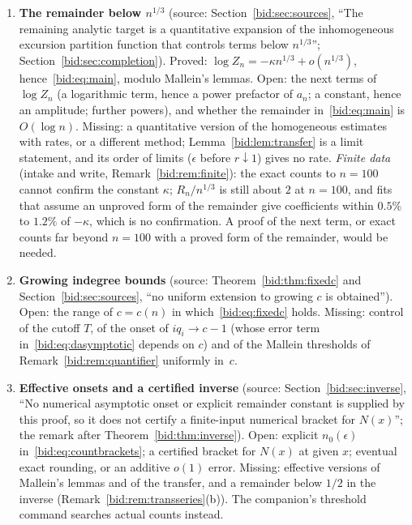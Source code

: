 \documentclass[11pt,letterpaper]{article}
\numberwithin{equation}{section}
\theoremstyle{remark}\newtheorem{remark}[theorem]{Remark}
\begin{document}
\begin{enumerate}
\item\label{bid:q:remainder} \textbf{The remainder below $n^{1/3}$} (source:
 Section~\ref{bid:sec:sources}, ``The remaining analytic target is a
 quantitative expansion of the inhomogeneous excursion partition function that
 controls terms below $n^{1/3}$''; Section~\ref{bid:sec:completion}). Proved:
 $\log Z_n=-\kappa n^{1/3}+o(n^{1/3})$, hence~\eqref{bid:eq:main}, modulo
 Mallein's lemmas. Open: the next terms of $\log Z_n$ (a logarithmic term,
 hence a power prefactor of $a_n$; a constant, hence an amplitude; further
 powers), and whether the remainder in~\eqref{bid:eq:main} is
 $O(\log n)$. Missing: a quantitative version of the homogeneous estimates
 with rates, or a different method; Lemma~\ref{bid:lem:transfer} is a
 limit statement, and its order of limits ($\epsilon$ before $r\downarrow1$)
 gives no rate. \emph{Finite data} (intake and write,
 Remark~\ref{bid:rem:finite}): the exact counts to $n=100$ cannot confirm the
 constant $\kappa$; $R_n/n^{1/3}$ is still about $2$ at $n=100$, and fits that
 assume an unproved form of the remainder give coefficients within $0.5\%$
 to $1.2\%$ of $-\kappa$, which is no confirmation. A proof of the next term,
 or exact counts far beyond $n=100$ with a proved form of the remainder,
 would be needed.
\item\label{bid:q:uniform} \textbf{Growing indegree bounds} (source:
 Theorem~\ref{bid:thm:fixedc} and Section~\ref{bid:sec:sources}, ``no uniform
 extension to growing $c$ is obtained''). Open: the range of $c=c(n)$ in
 which~\eqref{bid:eq:fixedc} holds. Missing: control of the cutoff $T$, of
 the onset of $iq_i\to c-1$ (whose error term in~\eqref{bid:eq:dasymptotic}
 depends on $c$) and of the Mallein thresholds of
 Remark~\ref{bid:rem:quantifier} uniformly in~$c$.
\item\label{bid:q:effective} \textbf{Effective onsets and a certified
 inverse} (source: Section~\ref{bid:sec:inverse}, ``No numerical asymptotic
 onset or explicit remainder constant is supplied by this proof, so it does
 not certify a finite-input numerical bracket for $N(x)$''; the remark after
 Theorem~\ref{bid:thm:inverse}). Open: explicit $n_0(\epsilon)$
 in~\eqref{bid:eq:countbrackets}; a certified bracket for $N(x)$ at given $x$;
 eventual exact rounding, or an additive $o(1)$ error. Missing: effective
 versions of Mallein's lemmas and of the transfer, and a remainder below
 $1/2$ in the inverse (Remark~\ref{bid:rem:transseries}(b)). The companion's
 threshold command searches actual counts instead.

\end{enumerate}
\end{document}
